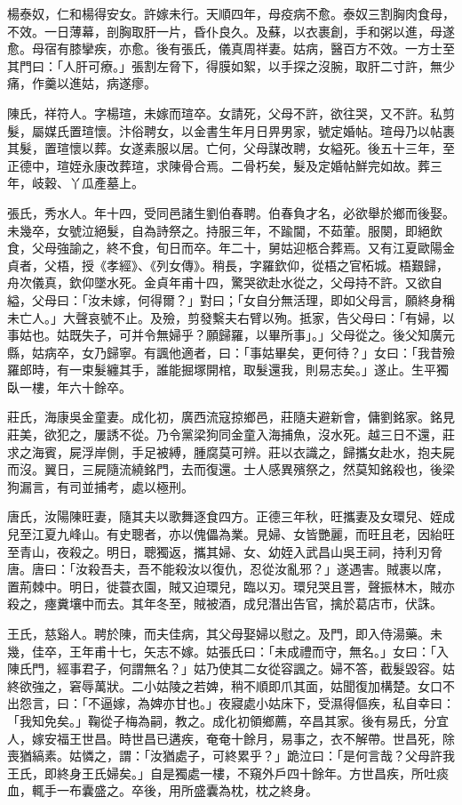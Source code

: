 \begin{pinyinscope}
楊泰奴，仁和楊得安女。許嫁未行。天順四年，母疫病不愈。泰奴三割胸肉食母，不效。一日薄幕，剖胸取肝一片，昏仆良久。及蘇，以衣裹創，手和粥以進，母遂愈。母宿有膝攣疾，亦愈。後有張氏，儀真周祥妻。姑病，醫百方不效。一方士至其門曰：「人肝可療。」張割左脅下，得膜如絮，以手探之沒腕，取肝二寸許，無少痛，作羹以進姑，病遂瘳。

陳氏，祥符人。字楊瑄，未嫁而瑄卒。女請死，父母不許，欲往哭，又不許。私剪髮，屬媒氏置瑄懷。汴俗聘女，以金書生年月日畀男家，號定婚帖。瑄母乃以帖裹其髮，置瑄懷以葬。女遂素服以居。亡何，父母謀改聘，女縊死。後五十三年，至正德中，瑄姪永康改葬瑄，求陳骨合焉。二骨朽矣，髮及定婚帖鮮完如故。葬三年，岐穀、丫瓜產墓上。

張氏，秀水人。年十四，受同邑諸生劉伯春聘。伯春負才名，必欲舉於鄉而後娶。未幾卒，女號泣絕髮，自為詩祭之。持服三年，不踰閫，不茹葷。服闋，即絕飲食，父母強諭之，終不食，旬日而卒。年二十，舅姑迎柩合葬焉。又有江夏歐陽金貞者，父梧，授《孝經》、《列女傳》。稍長，字羅欽仰，從梧之官柘城。梧艱歸，舟次儀真，欽仰墜水死。金貞年甫十四，驚哭欲赴水從之，父母持不許。又欲自縊，父母曰：「汝未嫁，何得爾？」對曰；「女自分無活理，即如父母言，願終身稱未亡人。」大聲哀號不止。及殮，剪發繫夫右臂以殉。抵家，告父母曰：「有婦，以事姑也。姑既失子，可并令無婦乎？願歸羅，以畢所事」。」父母從之。後父知廣元縣，姑病卒，女乃歸寧。有諷他適者，曰：「事姑畢矣，更何待？」女曰：「我昔殮羅郎時，有一束髮纏其手，誰能掘塚開棺，取髮還我，則易志矣。」遂止。生平獨臥一樓，年六十餘卒。

莊氏，海康吳金童妻。成化初，廣西流寇掠鄉邑，莊隨夫避新會，傭劉銘家。銘見莊美，欲犯之，屢誘不從。乃令黨梁狗同金童入海捕魚，沒水死。越三日不還，莊求之海賓，屍浮岸側，手足被縛，腫腐莫可辨。莊以衣識之，歸攜女赴水，抱夫屍而沒。翼日，三屍隨流繞銘門，去而復還。士人感異殯祭之，然莫知銘殺也，後梁狗漏言，有司並捕考，處以極刑。

唐氏，汝陽陳旺妻，隨其夫以歌舞逐食四方。正德三年秋，旺攜妻及女環兒、姪成兒至江夏九峰山。有史聰者，亦以傀儡為業。見婦、女皆艷麗，而旺且老，因紿旺至青山，夜殺之。明日，聰獨返，攜其婦、女、幼姪入武昌山吳王祠，持利刃脅唐。唐曰：「汝殺吾夫，吾不能殺汝以復仇，忍從汝亂邪？」遂遇害。賊裹以席，置荊棘中。明日，徙蓑衣園，賊又迫環兒，臨以刃。環兒哭且詈，聲振林木，賊亦殺之，瘞糞壤中而去。其年冬至，賊被酒，成兒潛出告官，擒於葛店市，伏誅。

王氏，慈谿人。聘於陳，而夫佳病，其父母娶婦以慰之。及門，即入侍湯藥。未幾，佳卒，王年甫十七，矢志不嫁。姑張氏曰：「未成禮而守，無名。」女曰：「入陳氏門，經事君子，何謂無名？」姑乃使其二女從容諷之。婦不答，截髮毀容。姑終欲強之，窘辱萬狀。二小姑陵之若婢，稍不順即爪其面，姑聞復加構楚。女口不出怨言，曰：「不逼嫁，為婢亦甘也。」夜寢處小姑床下，受濕得傴疾，私自幸曰：「我知免矣。」鞠從子梅為嗣，教之。成化初領鄉薦，卒昌其家。後有易氏，分宜人，嫁安福王世昌。時世昌已遘疾，奄奄十餘月，易事之，衣不解帶。世昌死，除喪猶縞素。姑憐之，謂：「汝猶處子，可終累乎？」跪泣曰：「是何言哉？父母許我王氏，即終身王氏婦矣。」自是獨處一樓，不窺外戶四十餘年。方世昌疾，所吐痰血，輒手一布囊盛之。卒後，用所盛囊為枕，枕之終身。


\end{pinyinscope}
